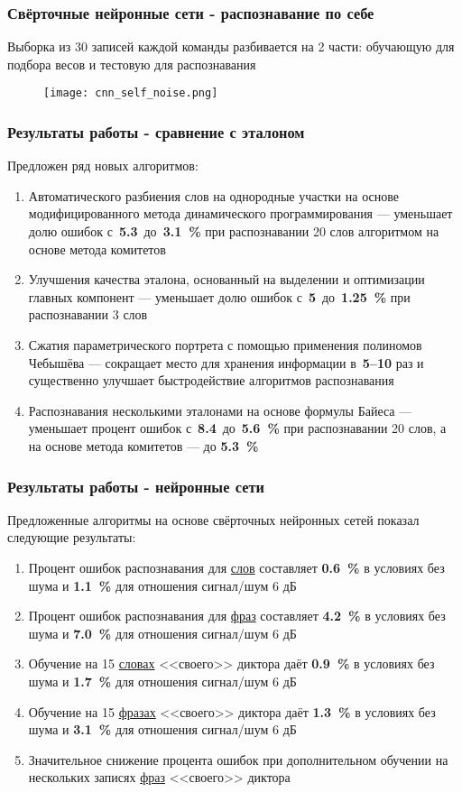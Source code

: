 \begin{frame}
\frametitle{\normalsize Свёрточные нейронные сети - распознавание по себе}
\small
\vfill
Выборка из 30 записей каждой команды разбивается на 2 части: обучающую для подбора весов и тестовую для распознавания
\vfill
\begin{figure}[h]
\centering
\texttt{[image: cnn\_self\_noise.png]}
\end{figure}
\vfill
\end{frame}


\begin{frame}
\frametitle{\large Результаты работы - сравнение с эталоном}
\small
\vfill
Предложен ряд новых алгоритмов:
\footnotesize
\vfill
\begin{enumerate}
	\item Автоматического разбиения слов на однородные участки на основе модифицированного метода динамического программирования --- уменьшает долю ошибок с~\textbf{5.3}~до~\textbf{3.1~\%} при распознавании 20 слов алгоритмом на основе метода комитетов
	\item Улучшения качества эталона, основанный на выделении и оптимизации главных компонент --- уменьшает долю ошибок с~\textbf{5}~до~\textbf{1.25~\%} при распознавании 3 слов
	\item Сжатия параметрического портрета с помощью применения полиномов Чебышёва --- сокращает место для хранения информации в~\textbf{5--10} раз и существенно улучшает быстродействие алгоритмов распознавания
	\item Распознавания несколькими эталонами на основе формулы Байеса --- уменьшает процент ошибок с~\textbf{8.4}~до~\textbf{5.6~\%} при распознавании 20 слов, а на основе метода комитетов --- до \textbf{5.3~\%}
\end{enumerate}
\vfill
\end{frame}

\begin{frame}
\frametitle{Результаты работы - нейронные сети}
\small
\vfill
Предложенные алгоритмы на основе свёрточных нейронных сетей показал следующие результаты:
\footnotesize
\vfill
\begin{enumerate}
	\item Процент ошибок распознавания для \underline{слов} составляет \textbf{0.6~\%} в условиях без шума и \textbf{1.1~\%} для отношения сигнал/шум 6 дБ
	\item Процент ошибок распознавания для \underline{фраз} составляет \textbf{4.2~\%} в условиях без шума и \textbf{7.0~\%} для отношения сигнал/шум 6 дБ
	\item Обучение на 15 \underline{словах} <<своего>> диктора даёт \textbf{0.9~\%} в условиях без шума и \textbf{1.7~\%} для отношения сигнал/шум 6 дБ
	\item Обучение на 15 \underline{фразах} <<своего>> диктора даёт \textbf{1.3~\%} в условиях без шума и \textbf{3.1~\%} для отношения сигнал/шум 6 дБ
	\item Значительное снижение процента ошибок при дополнительном обучении на нескольких записях \underline{фраз} <<своего>> диктора
\end{enumerate}
\vfill
\end{frame}

